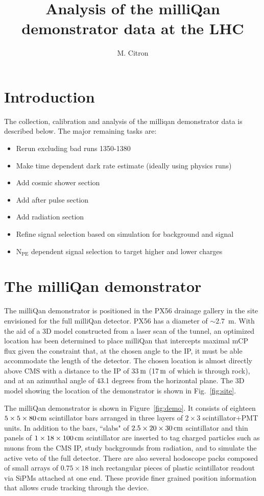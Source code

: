 \documentclass[12pt]{article}
\title{Analysis of the milliQan demonstrator data at the LHC}
\author{M. Citron}
\newcommand{\unit}[1]{\ensuremath{\text{\,#1}}\xspace}
\newcommand{\npe} {\mbox{\ensuremath{\textrm{N}_\textrm{PE}}}\xspace}
\begin{document}
\maketitle

\section{Introduction}

The collection, calibration and analysis of the milliqan demonstrator data is described below.
The major remaining tasks are:
\begin{itemize}
    \item Rerun excluding bad runs 1350-1380
    \item Make time dependent dark rate estimate (ideally using physics runs)
    \item Add cosmic shower section
    \item Add after pulse section
    \item Add radiation section
    \item Refine signal selection based on simulation for background and signal
    \item \npe dependent signal selection to target higher and lower charges
\end{itemize}

\section{The milliQan demonstrator}

The milliQan demonstrator is positioned in the PX56 drainage gallery in
the site envisioned for the full milliQan detector. PX56 has a diameter of $\sim 2.7$~m. 
With the aid of a 3D model constructed from a laser scan of the tunnel, 
an optimized location has been determined to place milliQan 
that intercepts maximal mCP flux given the constraint that, at the 
chosen angle to the IP, it must be able accommodate the length of the detector. 
The chosen location is almost directly above CMS with a distance to the IP of 
33\unit{m} (17\unit{m} of which is through rock), and at an azimuthal angle of 
43.1 degrees from the horizontal plane. The 3D model showing the location 
of the demonstrator is shown in Fig.~\ref{fig:site}.

The milliQan demonstrator is shown in Figure~\ref{fig:demo}. It
consists of eighteen $5\times5\times80\unit{cm}$ scintillator bars arranged in three layers of 
$2\times3$ scintillator+PMT units. In addition to the bars, ``slabs" of $2.5 \times 20 \times 30\unit{cm}$ 
scintillator and thin panels of $1 \times 18 \times 100\unit{cm}$ scintillator are 
inserted to tag charged particles such as muons from the CMS IP, study backgrounds 
from radiation, and to simulate the active veto of the full detector. There are also 
several hodoscope packs composed of small arrays of $0.75 \times 18$ inch rectangular 
pieces of plastic scintillator readout via SiPMs attached at one end. These provide 
finer grained position information that allows crude tracking through the device. 
\end{document}
